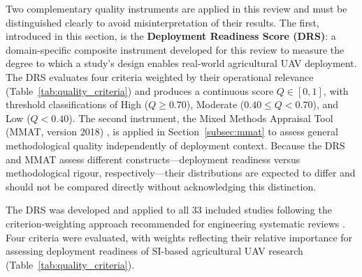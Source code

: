 \documentclass[review,3p,times]{elsarticle}
\begin{document}
Two complementary quality instruments are applied in this review and must be distinguished clearly to avoid misinterpretation of their results. The first, introduced in this section, is the \textbf{Deployment Readiness Score (DRS)}: a domain-specific composite instrument developed for this review to measure the degree to which a study's design enables real-world agricultural UAV deployment. The DRS evaluates four criteria weighted by their operational relevance (Table~\ref{tab:quality_criteria}) and produces a continuous score $Q \in [0, 1]$, with threshold classifications of High ($Q \geq 0.70$), Moderate ($0.40 \leq Q < 0.70$), and Low ($Q < 0.40$). The second instrument, the Mixed Methods Appraisal Tool (MMAT, version 2018) \cite{hong2018}, is applied in Section~\ref{subsec:mmat} to assess general methodological quality independently of deployment context. Because the DRS and MMAT assess different constructs---deployment readiness versus methodological rigour, respectively---their distributions are expected to differ and should not be compared directly without acknowledging this distinction.

The DRS was developed and applied to all 33 included studies following the criterion-weighting approach recommended for engineering systematic reviews \cite{brambilla2013}. Four criteria were evaluated, with weights reflecting their relative importance for assessing deployment readiness of SI-based agricultural UAV research (Table~\ref{tab:quality_criteria}).
\end{document}

